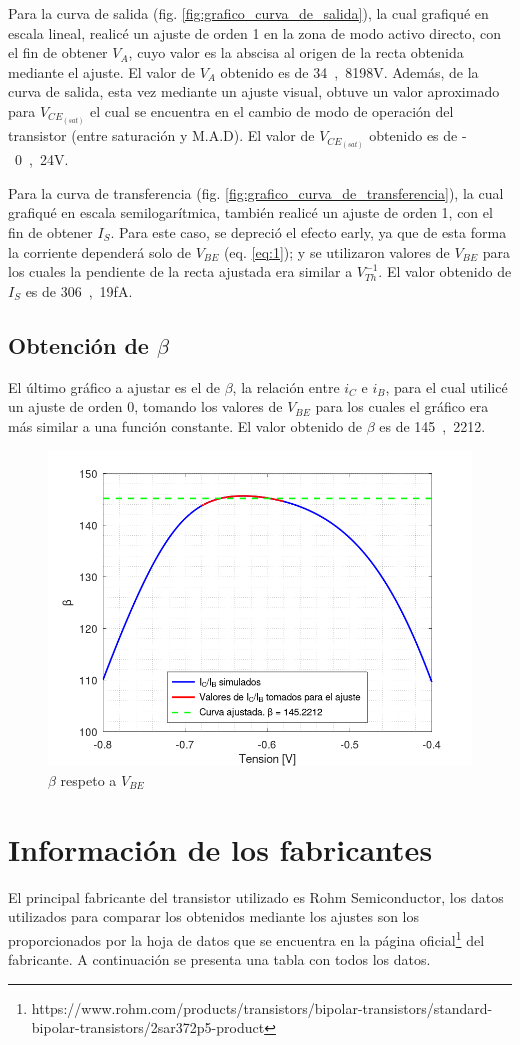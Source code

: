\documentclass[10pt]{article}
\begin{document}
\quad Para la curva de salida (fig. \ref{fig:grafico_curva_de_salida}), la cual grafiqué en escala lineal, realicé un ajuste de orden 1 en la zona de modo activo directo, con el fin de obtener $V_A$, cuyo valor es la abscisa al origen de la recta obtenida mediante el ajuste. El valor de $V_A$ obtenido es de \si{34,8198}{V}. Además, de la curva de salida, esta vez mediante un ajuste visual, obtuve un valor aproximado para $V_{CE_{(sat)}}$ el cual se encuentra en el cambio de modo de operación del transistor (entre saturación y M.A.D). El valor de $V_{CE_{(sat)}}$ obtenido es de \si{-0,24}{V}.

\quad Para la curva de transferencia (fig. \ref{fig:grafico_curva_de_transferencia}), la cual grafiqué en escala semilogarítmica, también realicé un ajuste de orden 1, con el fin de obtener $I_S$. Para este caso, se depreció el efecto early, ya que de esta forma la corriente dependerá solo de $V_{BE}$ (eq. \ref{eq:1}); y se utilizaron valores de $V_{BE}$ para los cuales la pendiente de la recta ajustada era similar a $V_{Th}^{-1}$. El valor obtenido de $I_S$ es de \si{306,19}{fA}.

\subsection{Obtención de $\beta$}

\quad El último gráfico a ajustar es el de $\beta$, la relación entre $i_C$ e $i_B$, para el cual utilicé un ajuste de orden 0, tomando los valores de $V_{BE}$ para los cuales el gráfico era más similar a una función constante. El valor obtenido de $\beta$ es de \si{145,2212}.

\begin{figure}[ht!]
    \centering
    \includegraphics[width=0.5\linewidth]{resources/grafico_beta.png}
    \caption{$\beta$ respeto a $V_{BE}$}
    \label{fig:grafico_beta}
\end{figure}



\section{Información de los fabricantes}
\quad El principal fabricante del transistor utilizado es Rohm Semiconductor, los datos utilizados para comparar los obtenidos mediante los ajustes son los proporcionados por la hoja de datos que se encuentra en la página oficial\footnote{https://www.rohm.com/products/transistors/bipolar-transistors/standard-bipolar-transistors/2sar372p5-product} del fabricante. A continuación se presenta una tabla con todos los datos.
\end{document}
